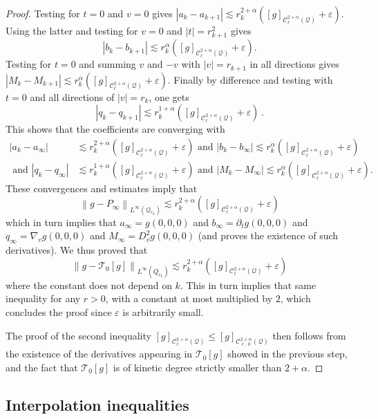 \documentclass[AHL,Unicode,longabstracts,published]{cedram}
\newcommand{\cC}{\mathcal{C}}
\newcommand{\cT}{\mathcal{T}}
\newcommand{\cQ}{\mathcal{Q}}
\newcommand*\eps{\varepsilon}
\begin{document}
\begin{proof}
Testing for $t=0$ and $v=0$ gives $|a_{k}-a_{k+1}| \lesssim r_{k}^{2+\alpha} ([g]_{\cC_\ell^{2+\alpha}(\cQ)}+\eps)$. Using the latter and testing for $v=0$ and $|t|=r_{k+1}^2$ gives
\[
\left|b_{k} - b_{k+1}\right| \lesssim r_{k}^{\alpha} \left([g]_{\cC_\ell^{2+\alpha}(\cQ)}+\eps\right).
\]
Testing for $t=0$ and summing $v$ and $-v$ with $|v|=r_{k+1}$ in all directions gives $|M_{k} - M_{k+1}| \lesssim r_{k}^{\alpha} ([g]_{\cC_\ell^{2+\alpha}(\cQ)}+\eps)$. Finally by difference and testing with $t=0$ and all directions of $|v|=r_k$, one gets
\[
\left|q_{k} - q_{k+1}\right| \lesssim r_{k}^{1+\alpha} \left([g]_{\cC_\ell^{2+\alpha}(\cQ)}+\eps\right)\,.
\]
This shows that the coefficients are converging with
\begin{align*}
\left|a_{k}-a_{\infty}\right| &\lesssim r_{k}^{2+\alpha} \left([g]_{\cC_\ell^{2+\alpha}(\cQ)}+\eps\right)\text{ and }\left|b_{k} - b_{\infty}\right| \lesssim r_{k}^{\alpha} \left([g]_{\cC_\ell^{2+\alpha}(\cQ)}+\eps\right)\\ 
\text{ and }\left|q_{k} - q_{\infty}\right| &\lesssim r_{k}^{1+\alpha} \left([g]_{\cC_\ell^{2+\alpha}(\cQ)}+\eps\right)
\text{ and }\left|M_{k} - M_{\infty}\right| \lesssim r_{k}^{\alpha} \left([g]_{\cC_\ell^{2+\alpha}(\cQ)}+\eps\right).
\end{align*}
These convergences and estimates imply that
\[
\left\| g - P_\infty \right\|_{L^\infty\left(\cQ_{r_k}\right)} \lesssim r_{k}^{2+\alpha} \left([g]_{\cC_\ell^{2+\alpha}(\cQ)}+\eps\right)
\]
which in turn implies that $a_\infty = g(0,0,0)$ and $b_\infty = \partial_t g(0,0,0)$ and $q_\infty = \nabla_v g(0,0,0)$ and $M_\infty = D^2 _v g(0,0,0)$ (and proves the existence of such derivatives). We thus proved that
\[
\left\|g-\cT_0[g] \right\|_{L^\infty\left(Q_{r_k}\right)} \lesssim r_{k}^{2+\alpha} \left([g]_{\cC_\ell^{2+\alpha}(\cQ)}+\eps\right)
\]
where the constant does not depend on $k$. This in turn implies that same inequality for any $r>0$, with a constant at most multiplied by $2$, which concludes the proof since $\eps$ is arbitrarily small.

The proof of the second inequality $[g]_{\cC_\ell^{2+\alpha}(\cQ)} \le [g]_{\cC_{\ell,\,0}^{2+\alpha}(\cQ)}$ then follows from the existence of the derivatives appearing in $\cT_0[g]$ showed in the previous step, and the fact that $\cT_{0}[g]$ is of kinetic degree strictly smaller than $2+\alpha$.
\end{proof}



\subsection{Interpolation inequalities}
\end{document}
